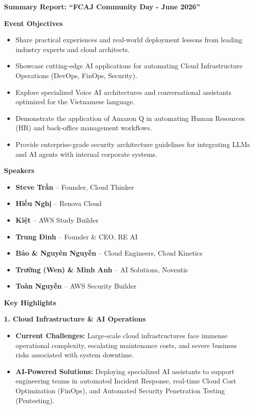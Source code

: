 \vspace{0.5em}\noindent\textbf{Summary Report: ``FCAJ Community Day - June 2026''}

\vspace{0.5em}\noindent\textbf{Event Objectives}

\begin{itemize}
\tightlist
\item
  Share practical experiences and real-world deployment lessons from
  leading industry experts and cloud architects.
\item
  Showcase cutting-edge AI applications for automating Cloud
  Infrastructure Operations (DevOps, FinOps, Security).
\item
  Explore specialized Voice AI architectures and conversational
  assistants optimized for the Vietnamese language.
\item
  Demonstrate the application of Amazon Q in automating Human Resources
  (HR) and back-office management workflows.
\item
  Provide enterprise-grade security architecture guidelines for
  integrating LLMs and AI agents with internal corporate systems.
\end{itemize}

\vspace{0.5em}\noindent\textbf{Speakers}

\begin{itemize}
\tightlist
\item
  \textbf{Steve Trần} -- Founder, Cloud Thinker
\item
  \textbf{Hiếu Nghị} -- Renova Cloud
\item
  \textbf{Kiệt} -- AWS Study Builder
\item
  \textbf{Trung Đinh} -- Founder \& CEO, RE AI
\item
  \textbf{Bảo \& Nguyên Nguyễn} -- Cloud Engineers, Cloud Kinetics
\item
  \textbf{Trường (Wen) \& Minh Anh} -- AI Solutions, Noventis
\item
  \textbf{Toàn Nguyễn} -- AWS Security Builder
\end{itemize}

\vspace{0.5em}\noindent\textbf{Key Highlights}

\vspace{0.5em}\noindent\textbf{1. Cloud Infrastructure \& AI Operations}

\begin{itemize}
\tightlist
\item
  \textbf{Current Challenges:} Large-scale cloud infrastructures face
  immense operational complexity, escalating maintenance costs, and
  severe business risks associated with system downtime.
\item
  \textbf{AI-Powered Solutions:} Deploying specialized AI assistants to
  support engineering teams in automated Incident Response, real-time
  Cloud Cost Optimization (FinOps), and Automated Security Penetration
  Testing (Pentesting).
\end{itemize}

